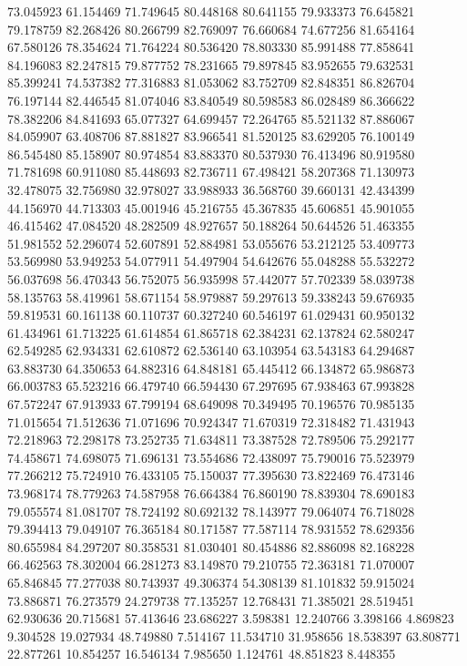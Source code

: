 73.045923
61.154469
71.749645
80.448168
80.641155
79.933373
76.645821
79.178759
82.268426
80.266799
82.769097
76.660684
74.677256
81.654164
67.580126
78.354624
71.764224
80.536420
78.803330
85.991488
77.858641
84.196083
82.247815
79.877752
78.231665
79.897845
83.952655
79.632531
85.399241
74.537382
77.316883
81.053062
83.752709
82.848351
86.826704
76.197144
82.446545
81.074046
83.840549
80.598583
86.028489
86.366622
78.382206
84.841693
65.077327
64.699457
72.264765
85.521132
87.886067
84.059907
63.408706
87.881827
83.966541
81.520125
83.629205
76.100149
86.545480
85.158907
80.974854
83.883370
80.537930
76.413496
80.919580
71.781698
60.911080
85.448693
82.736711
67.498421
58.207368
71.130973
32.478075
32.756980
32.978027
33.988933
36.568760
39.660131
42.434399
44.156970
44.713303
45.001946
45.216755
45.367835
45.606851
45.901055
46.415462
47.084520
48.282509
48.927657
50.188264
50.644526
51.463355
51.981552
52.296074
52.607891
52.884981
53.055676
53.212125
53.409773
53.569980
53.949253
54.077911
54.497904
54.642676
55.048288
55.532272
56.037698
56.470343
56.752075
56.935998
57.442077
57.702339
58.039738
58.135763
58.419961
58.671154
58.979887
59.297613
59.338243
59.676935
59.819531
60.161138
60.110737
60.327240
60.546197
61.029431
60.950132
61.434961
61.713225
61.614854
61.865718
62.384231
62.137824
62.580247
62.549285
62.934331
62.610872
62.536140
63.103954
63.543183
64.294687
63.883730
64.350653
64.882316
64.848181
65.445412
66.134872
65.986873
66.003783
65.523216
66.479740
66.594430
67.297695
67.938463
67.993828
67.572247
67.913933
67.799194
68.649098
70.349495
70.196576
70.985135
71.015654
71.512636
71.071696
70.924347
71.670319
72.318482
71.431943
72.218963
72.298178
73.252735
71.634811
73.387528
72.789506
75.292177
74.458671
74.698075
71.696131
73.554686
72.438097
75.790016
75.523979
77.266212
75.724910
76.433105
75.150037
77.395630
73.822469
76.473146
73.968174
78.779263
74.587958
76.664384
76.860190
78.839304
78.690183
79.055574
81.081707
78.724192
80.692132
78.143977
79.064074
76.718028
79.394413
79.049107
76.365184
80.171587
77.587114
78.931552
78.629356
80.655984
84.297207
80.358531
81.030401
80.454886
82.886098
82.168228
66.462563
78.302004
66.281273
83.149870
79.210755
72.363181
71.070007
65.846845
77.277038
80.743937
49.306374
54.308139
81.101832
59.915024
73.886871
76.273579
24.279738
77.135257
12.768431
71.385021
28.519451
62.930636
20.715681
57.413646
23.686227
3.598381
12.240766
3.398166
4.869823
9.304528
19.027934
48.749880
7.514167
11.534710
31.958656
18.538397
63.808771
22.877261
10.854257
16.546134
7.985650
1.124761
48.851823
8.448355
